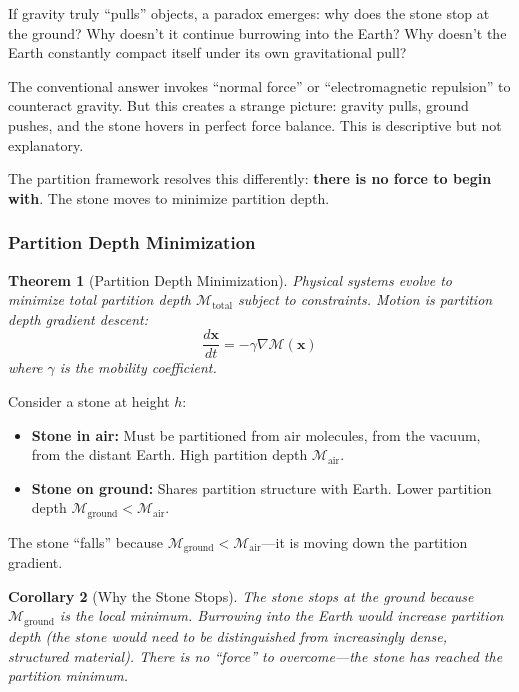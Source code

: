 \documentclass[twocolumn,10pt,a4paper]{article}
\newtheorem{theorem}{Theorem}[section]
\newtheorem{corollary}[theorem]{Corollary}
\theoremstyle{definition}
\theoremstyle{remark}
\newcommand{\Depth}{\mathcal{M}}
\begin{document}
If gravity truly ``pulls'' objects, a paradox emerges: why does the stone stop at the ground? Why doesn't it continue burrowing into the Earth? Why doesn't the Earth constantly compact itself under its own gravitational pull?

The conventional answer invokes ``normal force'' or ``electromagnetic repulsion'' to counteract gravity. But this creates a strange picture: gravity pulls, ground pushes, and the stone hovers in perfect force balance. This is descriptive but not explanatory.

The partition framework resolves this differently: \textbf{there is no force to begin with}. The stone moves to minimize partition depth.

\subsubsection{Partition Depth Minimization}

\begin{theorem}[Partition Depth Minimization]
\label{thm:depth_minimization}
Physical systems evolve to minimize total partition depth $\Depth_{\text{total}}$ subject to constraints. Motion is partition depth gradient descent:
\begin{equation}
    \frac{d\mathbf{x}}{dt} = -\gamma \nabla \Depth(\mathbf{x})
\end{equation}
where $\gamma$ is the mobility coefficient.
\end{theorem}

Consider a stone at height $h$:
\begin{itemize}
    \item \textbf{Stone in air:} Must be partitioned from air molecules, from the vacuum, from the distant Earth. High partition depth $\Depth_{\text{air}}$.
    \item \textbf{Stone on ground:} Shares partition structure with Earth. Lower partition depth $\Depth_{\text{ground}} < \Depth_{\text{air}}$.
\end{itemize}

The stone ``falls'' because $\Depth_{\text{ground}} < \Depth_{\text{air}}$---it is moving down the partition gradient.

\begin{corollary}[Why the Stone Stops]
The stone stops at the ground because $\Depth_{\text{ground}}$ is the local minimum. Burrowing into the Earth would \emph{increase} partition depth (the stone would need to be distinguished from increasingly dense, structured material). There is no ``force'' to overcome---the stone has reached the partition minimum.
\end{corollary}
\end{document}
